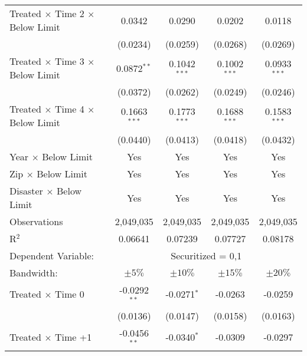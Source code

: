 \begin{tabular*}{0.8\textwidth}{@{\extracolsep{\fill}}lcccc}
   Treated $\times$ Time 2 $\times$ Below Limit      & 0.0342          & 0.0290          & 0.0202          & 0.0118\\   
                                                     & (0.0234)        & (0.0259)        & (0.0268)        & (0.0269)\\   
   Treated $\times$ Time 3 $\times$ Below Limit      & 0.0872$^{**}$   & 0.1042$^{***}$  & 0.1002$^{***}$  & 0.0933$^{***}$\\   
                                                     & (0.0372)        & (0.0262)        & (0.0249)        & (0.0246)\\   
   Treated $\times$ Time 4 $\times$ Below Limit      & 0.1663$^{***}$  & 0.1773$^{***}$  & 0.1688$^{***}$  & 0.1583$^{***}$\\   
                                                     & (0.0440)        & (0.0413)        & (0.0418)        & (0.0432)\\   
   \midrule
   Year $\times$ Below Limit                             & Yes             & Yes             & Yes             & Yes\\  
   Zip $\times$ Below Limit                              & Yes             & Yes             & Yes             & Yes\\  
   Disaster $\times$ Below Limit                         & Yes             & Yes             & Yes             & Yes\\  
   \midrule
   Observations                                        & 2,049,035       & 2,049,035       & 2,049,035       & 2,049,035\\  
   R$^2$                                               & 0.06641         & 0.07239         & 0.07727         & 0.08178\\  
   \midrule 
   Dependent Variable: & \multicolumn{4}{c}{Securitized = 0,1}\\
   Bandwidth:                                         & $\pm5\%$             & $\pm10\%$           & $\pm15\%$            & $\pm20\%$   \\  
   \midrule
    Treated $\times$ Time 0                         & -0.0292$^{**}$  & -0.0271$^{*}$         & -0.0263               & -0.0259\\   
                                                    & (0.0136)        & (0.0147)              & (0.0158)              & (0.0163)\\   
    Treated $\times$ Time +1                        & -0.0456$^{**}$  & -0.0340$^{*}$         & -0.0309               & -0.0297\\   

\end{tabular*}

